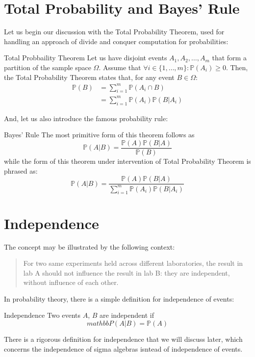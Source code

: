 \section{Total Probability and Bayes' Rule}
Let us begin our discussion with the Total Probability Theorem, used for handling an approach of divide and conquer computation for probabilities:
\begin{ln-theorem}{Total Probbaility Theorem}{}
    Let us have disjoint events $A_1, A_2, \dots, A_m$ that form a partition of the sample space $\Omega$.
    Assume that $\forall i \in \{1, \ldots, m\}: \mathbb{P}(A_i) \geq 0$.
    Then, the Total Probability Theorem states that, for any event $B \in \Omega$:
    \begin{align*}
        \mathbb{P}(B)
        &= \sum_{i = 1}^m \mathbb{P}(A_i \cap B) \\
        &= \sum_{i = 1}^m \mathbb{P}(A_i) \mathbb{P}(B | A_i)
    \end{align*}
\end{ln-theorem}

And, let us also introduce the famous probability rule:
\begin{ln-theorem}{Bayes' Rule}{}
    The most primitive form of this theorem follows as
    \[
        \mathbb{P}(A|B) = \frac{\mathbb{P}(A) \mathbb{P}(B|A)}{\mathbb{P}(B)}
    \]
    while the form of this theorem under intervention of Total Probability Theorem is phrased as:
    \[
        \mathbb{P}(A|B) = \frac{\mathbb{P}(A) \mathbb{P}(B|A)}{\sum_{i = 1}^m \mathbb{P}(A_i) \mathbb{P}(B | A_i)}
    \]
\end{ln-theorem}

\section{Independence}
The concept may be illustrated by the following context:
\begin{quote}
    For two same experiments held across different laboratories, the result in lab A should not influence the result in lab B: they are independent, without influence of each other.
\end{quote}
In probability theory, there is a simple definition for independence of events:
\begin{ln-define}{Independence}{}
    Two events $A$, $B$ are independent if \[mathbb{P}(A|B) = \mathbb{P}(A)\]
\end{ln-define}
There is a rigorous definition for independence that we will discuss later, which concerns the independence of sigma algebras isntead of independence of events.

